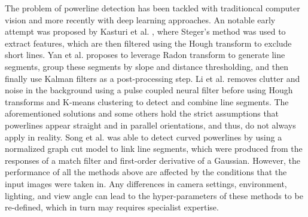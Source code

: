\documentclass[journal]{IEEEtran}
\begin{document}
The problem of powerline detection has been tackled with traditioncal computer vision and more recently with deep learning approaches. An notable early attempt was proposed by Kasturi et al. \cite{related_work_kasturi_2002}, where Steger's method \cite{related_work_steger_1998} was used to extract features, which are then filtered using the Hough transform to exclude short lines. Yan et al. \cite{related_work_guanjian_yan_2007} proposes to leverage Radon transform to generate line segments, group these segments by slope and distance thresholding, and then finally use Kalman filters as a post-processing step. Li et al. \cite{related_work_li_zhenrong_2010} removes clutter and noise in the background using a pulse coupled neural filter before using Hough transforms and K-means clustering to detect and combine line segments. The aforementioned solutions and some others \cite{related_work_candamo_2009, related_work_golightly_2005, related_work_zhengrong_li_2008, related_work_boris_alpatov_2016} hold the strict assumptions that powerlines appear straight and in parallel orientations, and thus, do not always apply in reality. Song et al. \cite{related_work_biqin_song_2014} was able to detect curved powerlines by using a normalized graph cut model to link line segments, which were produced from the responses of a match filter and first-order derivative of a Gaussian. However, the performance of all the methods above are affected by the conditions that the input images were taken in. Any differences in camera settings, environment, lighting, and view angle can lead to the hyper-parameters of these methods to be re-defined, which in turn may requires specialist expertise.
\end{document}
